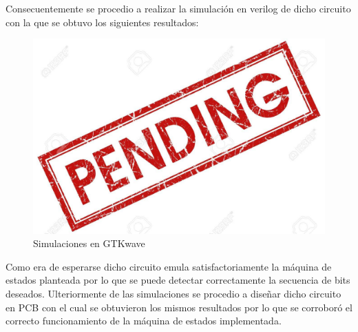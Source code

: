 Consecuentemente se procedio a realizar la simulación en verilog de dicho circuito con la que se obtuvo los siguientes resultados:

\begin{figure}[H]
\centering
\includegraphics{ImagenesEjercicio2/pend.jpg}
\caption{Simulaciones en GTKwave}
\end{figure}


Como era de esperarse dicho circuito emula satisfactoriamente la máquina de estados planteada por lo que se puede detectar correctamente la secuencia de bits deseados. Ulteriormente de las simulaciones se procedio a diseñar dicho circuito en PCB con el cual se obtuvieron los mismos resultados por lo que se corroboró el correcto funcionamiento de la máquina de estados implementada.